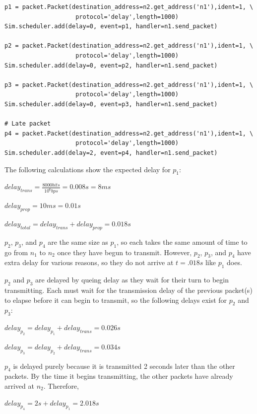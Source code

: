 \documentclass[11pt]{article}
\begin{document}
\begin{description}
\begin{lstlisting}[caption={Network 1.3},label=sec1exp3]
p1 = packet.Packet(destination_address=n2.get_address('n1'),ident=1, \
                    protocol='delay',length=1000)
Sim.scheduler.add(delay=0, event=p1, handler=n1.send_packet)

p2 = packet.Packet(destination_address=n2.get_address('n1'),ident=1, \
                    protocol='delay',length=1000)
Sim.scheduler.add(delay=0, event=p2, handler=n1.send_packet)

p3 = packet.Packet(destination_address=n2.get_address('n1'),ident=1, \
                    protocol='delay',length=1000)
Sim.scheduler.add(delay=0, event=p3, handler=n1.send_packet)

# Late packet
p4 = packet.Packet(destination_address=n2.get_address('n1'),ident=1, \
                    protocol='delay',length=1000)
Sim.scheduler.add(delay=2, event=p4, handler=n1.send_packet)
\end{lstlisting}

The following calculations show the expected delay for $p_1$:
\begin{addmargin}[1em]{0em}
$delay_{trans} = \frac{8000 bits}{10^{6}bps} = 0.008s = 8ms$

$delay_{prop} = 10ms = 0.01s$

$delay_{total} = delay_{trans} + delay_{prop} = 0.018s $
\end{addmargin}

$p_2$, $p_3$, and $p_4$ are the same size as $p_1$, so each takes the same amount of time to go from $n_1$ to $n_2$ once they have begun to transmit. However, $p_2$, $p_3$, and $p_4$ have extra delay for various reasons, so they do not arrive at $t = .018s$ like $p_1$ does.

$p_2$ and $p_3$ are delayed by queing delay as they wait for their turn to begin transmitting. Each must wait for the transmission delay of the previous packet(s) to elapse before it can begin to transmit, so the following delays exist for $p_2$ and $p_3$:
\begin{addmargin}[1em]{0em}
$delay_{p_{2}} = delay_{p_{1}} + delay_{trans} = 0.026s$

$delay_{p_{3}} = delay_{p_{2}} + delay_{trans} = 0.034s$
\end{addmargin}

$p_4$ is delayed purely because it is transmitted 2 seconds later than the other packets. By the time it begins transmitting, the other packets have already arrived at $n_2$. Therefore,
\begin{addmargin}[1em]{0em}
$delay_{p_{4}} = 2s + delay_{p_{1}} = 2.018s$
\end{addmargin}


\end{description}
\end{document}
